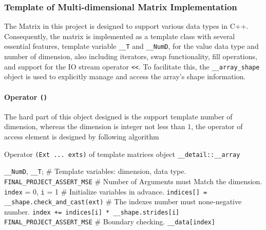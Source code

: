 \subsubsection{Template of Multi-dimensional Matrix Implementation}
The Matrix in this project is designed to support various data types in C++. 
Consequently, the matrix is implemented as a template class with several essential features, template 
variable \texttt{\_\_T} and \texttt{\_\_NumD}, for the value data type and number of dimension, 
also including iterators, swap functionality, fill operations, and support for the IO stream operator \texttt{<<}. 
To facilitate this, the \texttt{\_\_array\_shape} object is used to explicitly manage and access the array's shape information. 


\paragraph{Operator \texttt{()}}
The hard part of this object designed is the support template number of dimension, whereas the dimension 
is integer not less than $1$,
the operator of access element is designed by following algorithm
\begin{algorithm}
  \caption{Operator \texttt{(Ext ... exts)} of template matrices object \texttt{\_\_detail::\_\_array}}
  \begin{algorithmic}[1]
    \STATE \texttt{\_\_NumD}, \texttt{\_\_T};                   \hfill \# Template variables: dimension, data type.
    \STATE \texttt{FINAL\_PROJECT\_ASSERT\_MSE}                 \hfill \# Number of Arguments must Match the dimension.
    \STATE \texttt{index} = 0, \texttt{i} = 1                \hfill \# Initialize variables in advance.
    \STATE \texttt{indices[] = \_\_shape.check\_and\_cast(ext)}          \hfill \# The indexes number must none-negative number.
      \STATE \texttt{index += indices[i] * \_\_shape.strides[i]} 
    \ENDFOR
    \STATE \texttt{FINAL\_PROJECT\_ASSERT\_MSE}           \hfill \# Boundary checking.
    \RETURN \texttt{\_\_data[index]}
  \end{algorithmic}
\end{algorithm}

